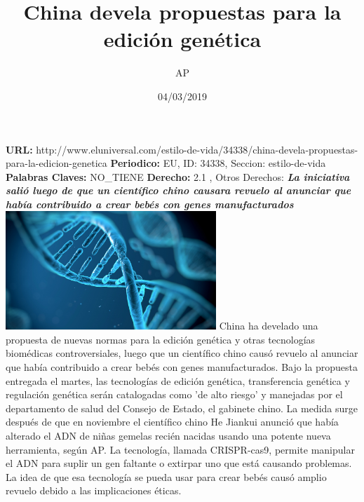 \documentclass{article}%
\title{\textbf{China devela propuestas para la edición genética}}%
\author{AP}%
\date{04/03/2019}%
\begin{document}
%
\normalsize%
\maketitle%
\textbf{URL: }%
http://www.eluniversal.com/estilo{-}de{-}vida/34338/china{-}devela{-}propuestas{-}para{-}la{-}edicion{-}genetica\newline%
%
\textbf{Periodico: }%
EU, %
ID: %
34338, %
Seccion: %
estilo{-}de{-}vida\newline%
%
\textbf{Palabras Claves: }%
NO\_TIENE\newline%
%
\textbf{Derecho: }%
2.1%
, Otros Derechos: %
\newline%
%
\textbf{\textit{La iniciativa salió luego de que un científico chino causara revuelo al anunciar que había contribuido a crear bebés con genes manufacturados}}%
\newline%
\newline%
%
\includegraphics[width=300px]{EU_34338.jpg}%
\newline%
%
China ha develado una propuesta de nuevas normas para la edición genética y otras tecnologías biomédicas controversiales, luego que un científico chino causó revuelo al anunciar que había contribuido a crear bebés con genes manufacturados.%
\newline%
%
Bajo la propuesta entregada el martes, las tecnologías de edición genética, transferencia genética y regulación genética serán catalogadas como 'de alto riesgo' y manejadas por el departamento de salud del Consejo de Estado, el gabinete chino.%
\newline%
%
La medida surge después de que en noviembre el científico chino He Jiankui anunció que había alterado el ADN de niñas gemelas recién nacidas usando una potente nueva herramienta, según AP.%
\newline%
%
La tecnología, llamada CRISPR{-}cas9, permite manipular el ADN para suplir un gen faltante o extirpar uno que está causando problemas. \newline%
\newline%
La idea de que esa tecnología se pueda usar para crear bebés causó amplio revuelo debido a las implicaciones éticas.%
\end{document}
